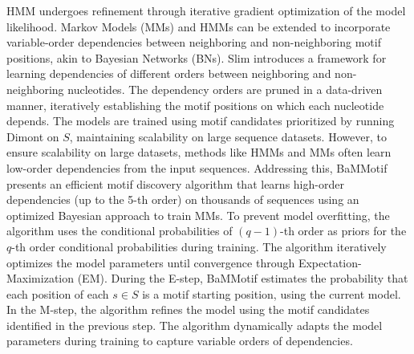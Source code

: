 \documentclass[a4paper, titlepage, openright]{book}
\begin{document}
HMM undergoes refinement through iterative gradient optimization of the model likelihood. Markov Models (MMs) and HMMs can be extended to incorporate variable-order dependencies between neighboring and non-neighboring motif positions, akin to Bayesian Networks (BNs). Slim \citep{keilwagen2015varying} introduces a framework for learning dependencies of different orders between neighboring and non-neighboring nucleotides. The dependency orders are pruned in a data-driven manner, iteratively establishing the motif positions on which each nucleotide depends. The models are trained using motif candidates prioritized by running Dimont on $S$, maintaining scalability on large sequence datasets. However, to ensure scalability on large datasets, methods like HMMs and MMs often learn low-order dependencies from the input sequences. Addressing this, BaMMotif \citep{siebert2016bayesian,ge2021bayesian} presents an efficient motif discovery algorithm that learns high-order dependencies (up to the 5-th order) on thousands of sequences using an optimized Bayesian approach to train MMs. To prevent model overfitting, the algorithm uses the conditional probabilities of $(q-1)$-th order as priors for the $q$-th order conditional probabilities during training. The algorithm iteratively optimizes the model parameters until convergence through Expectation-Maximization (EM). During the E-step, BaMMotif estimates the probability that each position of each $s \in S$ is a motif starting position, using the current model. In the M-step, the algorithm refines the model using the motif candidates identified in the previous step. The algorithm dynamically adapts the model parameters during training to capture variable orders of dependencies.

\end{document}
